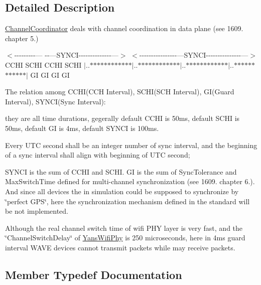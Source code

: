 \subsection{Detailed Description}
\hyperlink{classns3_1_1ChannelCoordinator}{Channel\+Coordinator} deals with channel coordination in data plane (see 1609. chapter 5.) 

$<$-\/-\/-\/-\/-\/-\/-\/-\/-\/--- -\/-\/---S\+Y\+N\+C\+I-\/-\/-\/-\/-\/-\/-\/-\/-\/-\/-\/-\/-\/-\/---$>$ $<$-\/-\/-\/-\/-\/-\/-\/-\/-\/-\/-\/-\/-\/-\/-\/-\/---S\+Y\+N\+C\+I-\/-\/-\/-\/-\/-\/-\/-\/-\/-\/-\/-\/-\/-\/-\/---$>$ C\+C\+HI S\+C\+HI C\+C\+HI S\+C\+HI $\vert$..$\ast$$\ast$$\ast$$\ast$$\ast$$\ast$$\ast$$\ast$$\ast$$\ast$$\ast$$\ast$$\vert$..$\ast$$\ast$$\ast$$\ast$$\ast$$\ast$$\ast$$\ast$$\ast$$\ast$$\ast$$\ast$$\vert$..$\ast$$\ast$$\ast$$\ast$$\ast$$\ast$$\ast$$\ast$$\ast$$\ast$$\ast$$\ast$$\vert$..$\ast$$\ast$$\ast$$\ast$$\ast$$\ast$$\ast$$\ast$$\ast$$\ast$$\ast$$\ast$$\vert$ GI GI GI GI

The relation among C\+C\+H\+I(\+C\+C\+H Interval), S\+C\+H\+I(\+S\+C\+H Interval), G\+I(\+Guard Interval), S\+Y\+N\+C\+I(\+Sync Interval)\+:
\begin{DoxyEnumerate}
\item they are all time durations, gegerally default C\+C\+HI is 50ms, default S\+C\+HI is 50ms, default GI is 4ms, default S\+Y\+N\+CI is 100ms.
\item Every U\+TC second shall be an integer number of sync interval, and the beginning of a sync interval shall align with beginning of U\+TC second;
\item S\+Y\+N\+CI is the sum of C\+C\+HI and S\+C\+HI. GI is the sum of Sync\+Tolerance and Max\+Switch\+Time defined for multi-\/channel synchronization (see 1609. chapter 6.). And since all devices the in simulation could be supposed to synchronize by \char`\"{}perfect G\+P\+S\char`\"{}, here the synchronization mechanism defined in the standard will be not implemented.
\item Although the real channel switch time of wifi P\+HY layer is very fast, and the \char`\"{}\+Channel\+Switch\+Delay\char`\"{} of \hyperlink{classns3_1_1YansWifiPhy}{Yans\+Wifi\+Phy} is 250 microseconds, here in 4ms guard interval W\+A\+VE devices cannot transmit packets while may receive packets. 
\end{DoxyEnumerate}

\subsection{Member Typedef Documentation}
